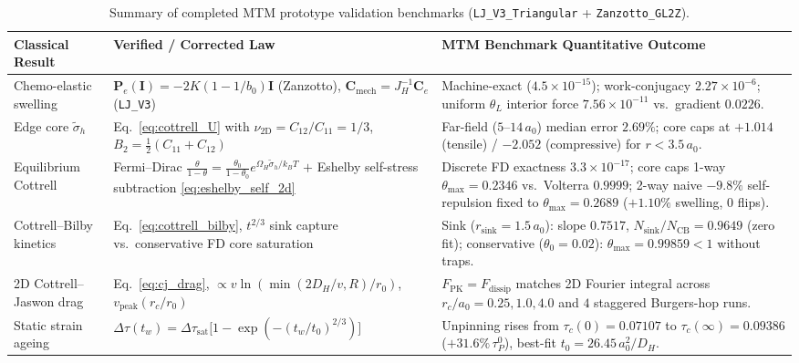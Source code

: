 \documentclass[11pt,a4paper]{article}
\newcommand{\code}[1]{\texttt{#1}}
\begin{document}
\begin{table}[ht!]
\centering
\small
\renewcommand{\arraystretch}{1.22}
\begin{tabular}{@{} >{\raggedright\arraybackslash}p{3.1cm} >{\raggedright\arraybackslash}p{5.2cm} >{\raggedright\arraybackslash}p{6.5cm} @{}}
\toprule
\textbf{Classical Result} & \textbf{Verified / Corrected Law} & \textbf{MTM Benchmark Quantitative Outcome} \\
\midrule
Chemo-elastic swelling & $\mathbf{P}_e(\mathbf{I}) = -2K(1 - 1/b_0)\mathbf{I}$ (Zanzotto), $\mathbf{C}_{\text{mech}} = J_H^{-1}\mathbf{C}_e$ (\code{LJ\_V3}) & Machine-exact ($4.5\times 10^{-15}$); work-conjugacy $2.27\times 10^{-6}$; uniform $\theta_L$ interior force $7.56\times 10^{-11}$ vs.\ gradient $0.0226$. \\
\addlinespace[2pt]
Edge core $\tilde{\sigma}_h$ & Eq.~\eqref{eq:cottrell_U} with $\nu_{2\mathrm{D}} = C_{12}/C_{11} = 1/3$, $B_2 = \frac{1}{2}(C_{11}+C_{12})$ & Far-field ($5\text{--}14\,a_0$) median error \textbf{$2.69\%$}; core caps at $+1.014$ (tensile) / $-2.052$ (compressive) for $r < 3.5\,a_0$. \\
\addlinespace[2pt]
Equilibrium Cottrell & Fermi--Dirac $\frac{\theta}{1-\theta} = \frac{\theta_0}{1-\theta_0}e^{\Omega_H \tilde{\sigma}_h/k_BT}$ $+$ Eshelby self-stress subtraction \eqref{eq:eshelby_self_2d} & Discrete FD exactness $3.3\times 10^{-17}$; core caps 1-way $\theta_{\max} = 0.2346$ vs.\ Volterra $0.9999$; 2-way naive $-9.8\%$ self-repulsion fixed to $\theta_{\max} = 0.2689$ ($+1.10\%$ swelling, $0$ flips). \\
\addlinespace[2pt]
Cottrell--Bilby kinetics & Eq.~\eqref{eq:cottrell_bilby}, $t^{2/3}$ sink capture vs.\ conservative FD core saturation & Sink ($r_{\text{sink}} = 1.5\,a_0$): slope $0.7517$, $N_{\text{sink}}/N_{\text{CB}} = 0.9649$ (zero fit); conservative ($\theta_0=0.02$): $\theta_{\max}=0.99859 < 1$ without traps. \\
\addlinespace[2pt]
2D Cottrell--Jaswon drag & Eq.~\eqref{eq:cj_drag}, $\propto v\ln(\min(2D_H/v,R)/r_0)$, $v_{\text{peak}}(r_c/r_0)$ & $F_{\text{PK}} = F_{\text{dissip}}$ matches 2D Fourier integral across $r_c/a_0 = 0.25, 1.0, 4.0$ and $4$ staggered Burgers-hop runs. \\
\addlinespace[2pt]
Static strain ageing & $\Delta\tau(t_w) = \Delta\tau_{\mathrm{sat}}\bigl[1 - \exp(-(t_w/t_0)^{2/3})\bigr]$ & Unpinning rises from $\tau_c(0)=0.07107$ to $\tau_c(\infty)=0.09386$ ($+31.6\%\,\tau_P^0$), best-fit $t_0 = 26.45\,a_0^2/D_H$. \\
\bottomrule
\end{tabular}
\caption{Summary of completed MTM prototype validation benchmarks (\code{LJ\_V3\_Triangular} + \code{Zanzotto\_GL2Z}).}
\label{tab:validation_summary}
\end{table}
\end{document}
